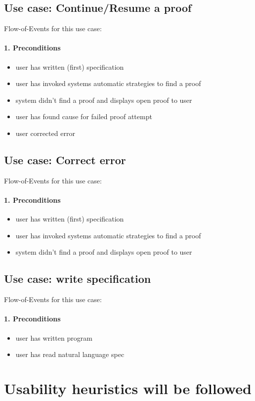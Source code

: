 \documentclass{article}
\begin{document}
\subsection{Use case: Continue/Resume a proof}
Flow-of-Events for this use case:
\paragraph{1. Preconditions}
\begin{itemize}
 \item user has written (first) specification
 \item user has invoked systems automatic strategies to find a proof
 \item system didn't find a proof and displays open proof to user
 \item user has found cause for failed proof attempt
 \item user corrected error
\end{itemize}
\subsection{Use case: Correct error}
Flow-of-Events for this use case:
\paragraph{1. Preconditions}
\begin{itemize}
 \item user has written (first) specification
  \item user has invoked systems automatic strategies to find a proof
 \item system didn't find a proof and displays open proof to user
\end{itemize}
\subsection{Use case: write specification}
Flow-of-Events for this use case:
\paragraph{1. Preconditions}
\begin{itemize}
 \item user has written program 
 \item user has read natural language spec
\end{itemize}
\section{Usability heuristics will be followed}
\end{document}
